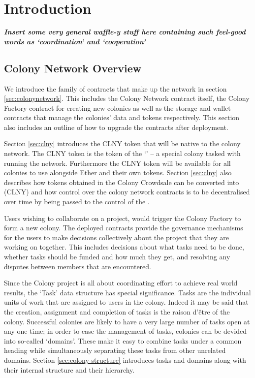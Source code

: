 \section{Introduction}


\textbf{\emph{Insert some very general waffle-y stuff here containing such feel-good words as `coordination' and `cooperation'}}

\subsection{Colony Network Overview}


We introduce the family of contracts that make up the network in section \ref{sec:colonynetwork}. This includes the Colony Network contract itself, the Colony Factory contract for creating new colonies as well as the storage and wallet contracts that manage the colonies' data and tokens respectively. This section also includes an outline of how to upgrade the contracts after deployment.

Section \ref{sec:clny} introduces the CLNY token that will be native to the colony network. The CLNY token is the token of the `\rc' -- a special colony tasked with running the network. Furthermore the CLNY token will be available for all colonies to use alongside Ether and their own tokens. Section \ref{sec:clny} also describes how tokens obtained in the Colony Crowdsale can be converted into \rcts (CLNY) and how control over the colony network contracts is to be decentralised over time by being passed to the control of the \rc.

Users wishing to collaborate on a project, would trigger the Colony Factory to form a new colony. The deployed contracts provide the governance mechanisms for the users to make decisions collectively about the project that they are working on together. This includes decisions about what tasks need to be done, whether tasks should be funded and how much they get, and resolving any disputes between members that are encountered.

Since the Colony project is all about coordinating effort to achieve real world results, the `Task' data structure has special significance. Tasks are the individual units of work that are assigned to  users in the colony. Indeed it may be said that the creation, assignment and completion of tasks is the raison d'être of the colony. Successful colonies are likely to have a very large number of tasks open at any one time; in order to ease the management of tasks, colonies can be devided into so-called `domains'. These make it easy to combine tasks under a common heading while simultaneously separating these tasks from other unrelated domains. Section \ref{sec:colony-structure} introduces tasks and domains along with their internal structure and their hierarchy.

